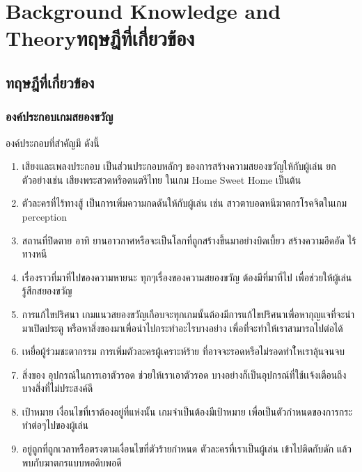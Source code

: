 \chapter{\ifenglish Background Knowledge and Theory\else ทฤษฎีที่เกี่ยวข้อง\fi}


\section{ทฤษฎีที่เกี่ยวข้อง}
\subsection{องค์ประกอบเกมสยองขวัญ} \cite{component-horror:theory} องค์ประกอบที่สำคัญมี ดังนี้
\begin{enumerate}
  \item เสียงและเพลงประกอบ เป็นส่วนประกอบหลักๆ ของการสร้างความสยองขวัญให้กับผู้เล่น ยกตัวอย่างเช่น เสียงพระสวดหรือดนตรีไทย ในเกม Home Sweet Home เป็นต้น
  \item ตัวละครที่ไร้ทางสู้ เป็นการเพิ่มความกดดันให้กับผู้เล่น เช่น สาวตาบอดหนีฆาตกรโรคจิตในเกม perception
  \item สถานที่ปิดตาย อาทิ ยานอาวกาศหรือจะเป็นโลกที่ถูกสร้างขึ้นมาอย่างบิดเบี้ยว สร้างความอึดอัด ไร้ทางหนี
  \item เรื่องราวที่มาที่ไปของความหายนะ ทุกๆเรื่องของความสยองขวัญ ต้องมีที่มาที่ไป เพื่อช่วยให้ผู้เล่นรู้สึกสยองขวัญ
  \item การแก้ไขปริศนา เกมแนวสยองขวัญเกือบจะทุกเกมนั้นต้องมีการแก้ไขปริศนาเพื่อหากุญแจที่จะนำมาเปิดประตู หรือหาสิ่งของมาเพื่อนำไปกระทำอะไรบางอย่าง เพื่อที่จะทำให้เราสามารถไปต่อได้
  \item เหยื่อผู้ร่วมชะตากรรม การเพิ่มตัวละครผู้เคราะห์ร้าย ที่อาจจะรอดหรือไม่รอดทำใ้หเราลุ้นจนจบ
  \item สิ่งของ อุปกรณ์ในการเอาตัวรอด ช่วยให้เราเอาตัวรอด บางอย่างก็เป็นอุปกรณ์ที่ใช้เเจ้งเตือนถึงบางสิ่งที่ไม่ประสงค์ดี
  \item เป้าหมาย เงื่อนไขที่เราต้องอยู่ที่แห่งนั้น เกมจำเป็นต้องมีเป้าหมาย เพื่อเป็นตัวกำหนดของการกระทำต่อๆไปของผู้เล่น
  \item อยู่ถูกที่ถูกเวลาหรือตรงตามเงื่อนไขที่ตัวร้ายกำหนด ตัวละครที่เราเป็นผู้เล่น เข้าไปติดกับดัก แล้วพบกับฆาตกรแบบพอดิบพอดี
\end{enumerate}


